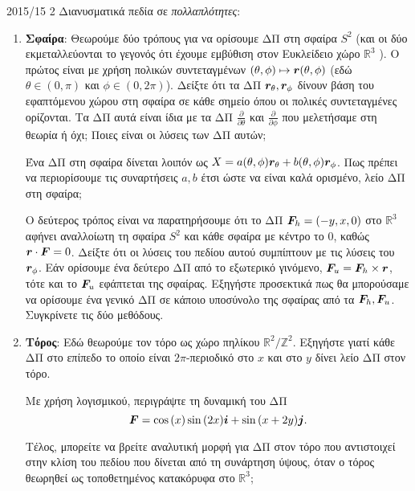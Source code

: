 \documentclass[a4paper,11pt]{article}
\begin{document}
\begin{exercise}{2015/15 2}
    Διανυσματικά πεδία σε \emph{πολλαπλότητες}:
    \begin{enumerate}
        \item \textbf{Σφαίρα}: Θεωρούμε δύο τρόπους για να ορίσουμε ΔΠ στη
            σφαίρα \( S^2 \) (και οι δύο εκμεταλλεύονται το γεγονός ότι έχουμε
            εμβύθιση στον Ευκλείδειο χώρο \( \mathbb{R}^3 \) ).
            Ο πρώτος είναι με χρήση πολικών συντεταγμένων
            \( (\theta, \phi) \mapsto \bm{r}(\theta, \phi) \)
            (εδώ \( \theta \in (0, \pi) \) και \( \phi \in (0, 2\pi) \)).
            Δείξτε ότι τα ΔΠ \( \bm{r}_{\theta}, \bm{r}_{\phi} \) δίνουν
            βάση του εφαπτόμενου χώρου στη σφαίρα σε κάθε σημείο όπου οι
            πολικές συντεταγμένες ορίζονται. Τα ΔΠ αυτά είναι ίδια με τα ΔΠ
            \( \frac{\partial}{\partial \theta} \) και \( \frac{\partial}{\partial \phi} \)
            που μελετήσαμε στη θεωρία ή όχι; Ποιες είναι οι λύσεις των ΔΠ αυτών;

            Ένα ΔΠ στη σφαίρα δίνεται λοιπόν ως \( X = a(\theta,
            \phi)\bm{r}_{\theta} + b(\theta, \phi)\bm{r}_{\phi} \). Πως πρέπει
            να περιορίσουμε τις συναρτήσεις \( a, b \) έτσι ώστε να είναι καλά
            ορισμένο, λείο ΔΠ στη σφαίρα;

            Ο δεύτερος τρόπος είναι να παρατηρήσουμε ότι το ΔΠ \( \bm{F}_h =
            (-y, x, 0) \) στο \( \mathbb{R}^3 \) αφήνει αναλλοίωτη τη σφαίρα \(
            S^2 \) και κάθε σφαίρα με κέντρο το \( 0 \), καθώς \( \bm{r} \cdot
            \bm{F} = 0 \). Δείξτε ότι οι λύσεις του πεδίου αυτού συμπίπτουν με
            τις λύσεις του \( \bm{r}_{\phi} \). Εάν ορίσουμε ένα δεύτερο ΔΠ από
            το εξωτερικό γινόμενο, \( \bm{F}_u = \bm{F}_h \times \bm{r} \), τότε και
            το \( \bm{F}_u \) εφάπτεται της σφαίρας. Εξηγήστε προσεκτικά πως θα
            μπορούσαμε να ορίσουμε ένα γενικό ΔΠ σε κάποιο υποσύνολο της σφαίρας
            από τα \( \bm{F}_h, \bm{F}_u \). Συγκρίνετε τις δύο μεθόδους.
        \item \textbf{Τόρος}: Εδώ θεωρούμε τον τόρο ως χώρο πηλίκου \(
            \mathbb{R}^2/\mathbb{Z}^2 \). Εξηγήστε γιατί κάθε ΔΠ στο επίπεδο το
            οποίο είναι \(2\pi\)-περιοδικό στο \(x\) και στο \(y\) δίνει λείο ΔΠ
            στον τόρο.

            Με χρήση λογισμικού, περιγράψτε τη δυναμική του ΔΠ
            \begin{equation*}
                \bm{F} = \cos{(x)}\sin{(2x)}\bm{i} + \sin{(x + 2y)}\bm{j}.
            \end{equation*}

            Τέλος, μπορείτε να βρείτε αναλυτική μορφή για ΔΠ στον τόρο που
            αντιστοιχεί στην κλίση του πεδίου που δίνεται από τη συνάρτηση
            ύψους, όταν ο τόρος θεωρηθεί ως τοποθετημένος κατακόρυφα στο \(
            \mathbb{R}^3 \);
    \end{enumerate}
\end{exercise}
\end{document}
